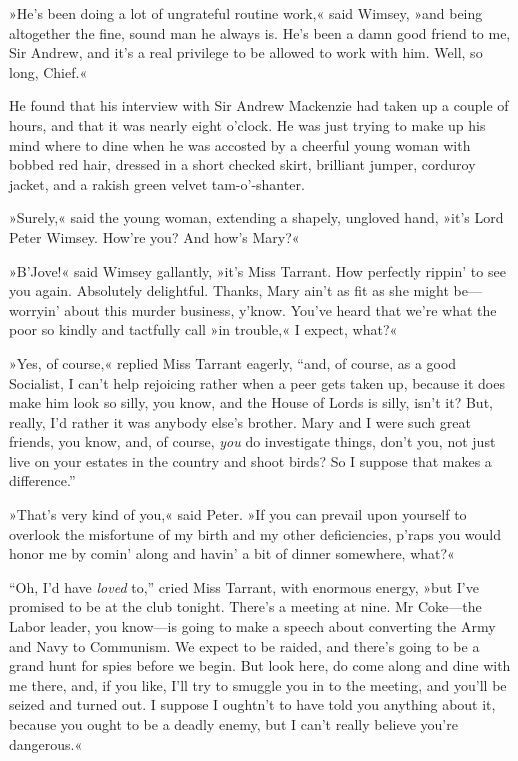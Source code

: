 »He's been doing a lot of ungrateful routine work,« said Wimsey, »and being altogether the fine, sound man he always is. He's been a damn good friend to me, Sir Andrew, and it's a real privilege to be allowed to work with him. Well, so long, Chief.«

He found that his interview with Sir Andrew Mackenzie had taken up a couple of hours, and that it was nearly eight o'clock. He was just trying to make up his mind where to dine when he was accosted by a cheerful young woman with bobbed red hair, dressed in a short checked skirt, brilliant jumper, corduroy jacket, and a rakish green velvet tam-o'-shanter.

»Surely,« said the young woman, extending a shapely, ungloved hand, »it's Lord Peter Wimsey. How're you? And how's Mary?«

»B'Jove!« said Wimsey gallantly, »it's Miss Tarrant. How perfectly rippin' to see you again. Absolutely delightful. Thanks, Mary ain't as fit as she might be\allowbreak---\allowbreak worryin' about this murder business, y'know.  You've heard that we're what the poor so kindly and tactfully call »in trouble,« I expect, what?«

»Yes, of course,« replied Miss Tarrant eagerly, \enquote{and, of course, as a good Socialist, I can't help rejoicing rather when a peer gets taken up, because it does make him look so silly, you know, and the House of Lords is silly, isn't it? But, really, I'd rather it was anybody else's brother. Mary and I were such great friends, you know, and, of course, \textit{you} do investigate things, don't you, not just live on your estates in the country and shoot birds? So I suppose that makes a difference.}

»That's very kind of you,« said Peter. »If you can prevail upon yourself to overlook the misfortune of my birth and my other deficiencies, p'raps you would honor me by comin' along and havin' a bit of dinner somewhere, what?«

\enquote{Oh, I'd have \textit{loved} to,} cried Miss Tarrant, with enormous energy, »but I've promised to be at the club tonight. There's a meeting at nine. Mr Coke\allowbreak---\allowbreak the Labor leader, you know\allowbreak---\allowbreak is going to make a speech about converting the Army and Navy to Communism. We expect to be raided, and there's going to be a grand hunt for spies before we begin.  But look here, do come along and dine with me there, and, if you like, I'll try to smuggle you in to the meeting, and you'll be seized and turned out. I suppose I oughtn't to have told you anything about it, because you ought to be a deadly enemy, but I can't really believe you're dangerous.«

